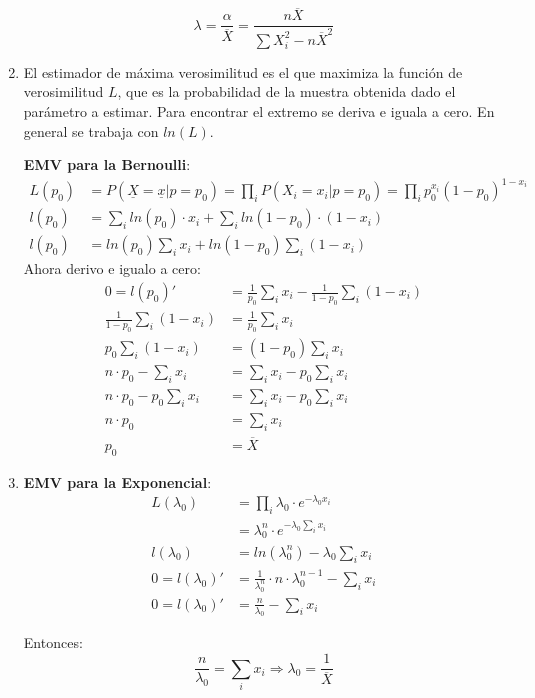 \begin{enumerate}
		$$\lambda = \frac{\alpha}{\overline{X}} = \frac{n\overline{X}}{\sum X_i^2 - n\overline{X}^2}$$
		
	\item
		El estimador de máxima verosimilitud es el que maximiza la función de verosimilitud $L$, que es la probabilidad de la muestra obtenida dado el parámetro a estimar.
		Para encontrar el extremo se deriva e iguala a cero. En general se trabaja con $ln(L)$.
		
		\textbf{EMV para la Bernoulli}:
		\begin{align*}
			L(p_0)		& = P(\underline{X} = \underline{x} | p=p_0) = \prod_i P(X_i = x_i|p=p_0) = \prod_i p_0^{x_i}(1-p_0)^{1-x_i}	\\
			l(p_0)		& = \sum_i ln(p_0)\cdot x_i + \sum_i ln(1-p_0)\cdot (1-x_i)		\\
			l(p_0)		& = ln(p_0)\sum_i x_i + ln(1-p_0) \sum_i(1-x_i)
		\end{align*}
		Ahora derivo e igualo a cero:
		\begin{align*}
			0 = l(p_0)'	& = \frac{1}{p_0}\sum_i x_i - \frac{1}{1-p_0} \sum_i(1-x_i)		\\
			\frac{1}{1-p_0} \sum_i(1-x_i)	& = \frac{1}{p_0}\sum_i x_i					\\
			p_0 \sum_i(1-x_i) 				& = (1-p_0)\sum_i x_i						\\
			n\cdot p_0 - \sum_i x_i 		& = \sum_i x_i -p_0\sum_i x_i				\\
			n\cdot p_0 - p_0 \sum_i x_i		& = \sum_i x_i -p_0\sum_i x_i				\\
			n\cdot p_0						& = \sum_i x_i								\\
			p_0								& = \overline{X}
		\end{align*}
	
	\item
		\textbf{EMV para la Exponencial}:
		\begin{align*}
			L(\lambda_0)		& = \prod_i \lambda_0 \cdot e^{-\lambda_0 x_i}	\\
								& = \lambda_0^n \cdot e^{-\lambda_0 \sum_i x_i}	\\
			l(\lambda_0)		& = ln(\lambda_0^n) -\lambda_0 \sum_i x_i	\\
			0 = l(\lambda_0)'	& = \frac{1}{\lambda_0^n}\cdot n\cdot \lambda_0^{n-1} - \sum_i x_i	\\
			0 = l(\lambda_0)'	& = \frac{n}{\lambda_0} - \sum_i x_i
		\end{align*}
		
		Entonces:
			$$\frac{n}{\lambda_0} = \sum_i x_i \Rightarrow \lambda_0 = \frac{1}{\overline{X}}$$
			

\end{enumerate}
